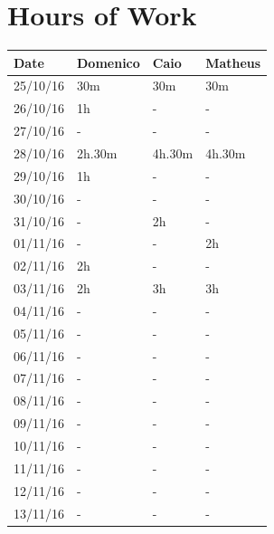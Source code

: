 \documentclass[a4paper]{article}
\begin{document}
\section{Hours of Work}
\begin{tabular}{ | l | l | l | l | }
\hline
	\textbf {Date} & \textbf {Domenico} & \textbf {Caio} & \textbf {Matheus} \\ \hline
	25/10/16& 30m & 30m & 30m \\ \hline
	26/10/16& 1h & -  & -  \\ \hline
	27/10/16&  - & - & -  \\ \hline
	28/10/16& 2h.30m & 4h.30m & 4h.30m \\ \hline
	29/10/16& 1h & -  & - \\ \hline
	30/10/16&  - & - & - \\ \hline
	31/10/16&  - & 2h & - \\ \hline
	01/11/16&  - & - & 2h \\ \hline
	02/11/16&  2h & - & - \\ \hline
	03/11/16&  2h & 3h & 3h \\ \hline
	04/11/16&  - & - & - \\ \hline
	05/11/16&  - & - & - \\ \hline
	06/11/16&  - & - & - \\ \hline
	07/11/16&  - & - & - \\ \hline
	08/11/16&  - & - & - \\ \hline
	09/11/16&  - & - & - \\ \hline
	10/11/16&  - & - & - \\ \hline
	11/11/16&  - & - & - \\ \hline
	12/11/16&  - & - & - \\ \hline
	13/11/16&  - & - & - \\ \hline
\end{tabular}

\newpage
\end{document}
